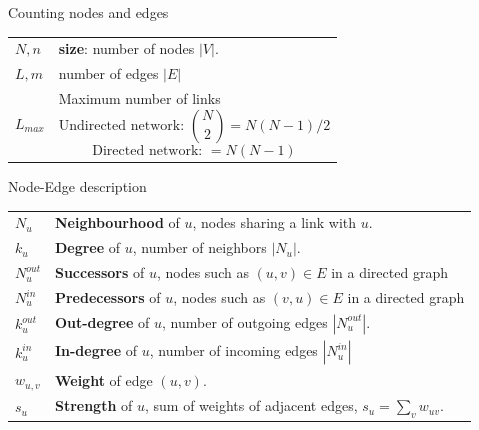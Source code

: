 \documentclass[a4paper,11pt]{book}
\begin{document}
\begin{textbox}{Counting nodes and edges}

\begin{tabular}{p{}|p{}}\scriptsize
$N,n$ & \textbf{size}: number of nodes $|V|$.  \\

$L,m$ & number of edges $|E|$\\
$L_{max}$ & Maximum number of links
\[  \text{Undirected network: } {N\choose 2 }=N(N-1)/2
\]
\[
 \text{Directed network: }=N(N-1)
\]

\end{tabular}

\end{textbox}










\begin{textbox}{Node-Edge description}
\begin{tabular}{p{}|p{}}\scriptsize

$N_u$ & \textbf{Neighbourhood} of $u$, nodes sharing a link with $u$. \\


$k_u$ & \textbf{Degree} of $u$, number of neighbors $|N_u|$. \\
\hline
$N^{out}_u$ & \textbf{Successors} of $u$, nodes such as $(u,v)\in E$ in a directed graph \\

$N^{in}_u$ & \textbf{Predecessors} of $u$, nodes such as $(v,u)\in E$ in a directed graph \\

$k^{out}_u$ & \textbf{Out-degree} of $u$, number of outgoing edges  $|N^{out}_u|$. \\

$k^{in}_u$ & \textbf{In-degree} of $u$, number of incoming edges $|N^{in}_u|$ \\

\hline

$w_{u,v}$ & \textbf{Weight} of edge $(u,v)$. \\

$s_u$ & \textbf{Strength} of $u$, sum of weights of adjacent edges, $s_u = \sum_v w_{uv}$. \\
\end{tabular}

\end{textbox}
\end{document}
